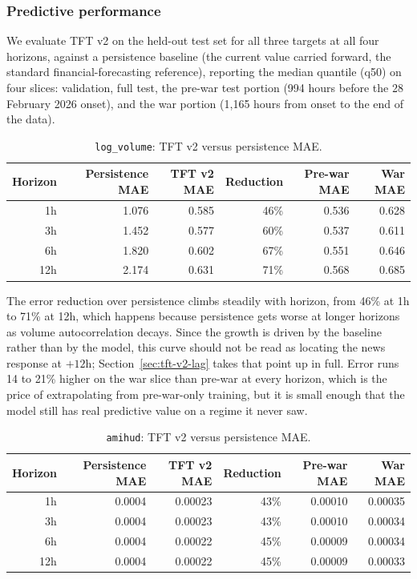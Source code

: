 \subsubsection{Predictive performance}\label{sec:predictive-performance}

We evaluate TFT v2 on the held-out test set for all three targets at all four horizons, against a persistence baseline (the current value carried forward, the standard financial-forecasting reference), reporting the median quantile (q50) on four slices: validation, full test, the pre-war test portion (994 hours before the 28 February 2026 onset), and the war portion (1{,}165 hours from onset to the end of the data).

\begin{table}[h]
  \centering
  \caption{\texttt{log\_volume}: TFT v2 versus persistence MAE.}
  \label{tab:mae-logvolume}
  \begin{tabular}{@{}rrrrrr@{}}
    \toprule
    Horizon & Persistence MAE & TFT v2 MAE & Reduction & Pre-war MAE & War MAE \\
    \midrule
    1h & 1.076 & 0.585 & 46\% & 0.536 & 0.628 \\
    3h & 1.452 & 0.577 & 60\% & 0.537 & 0.611 \\
    6h & 1.820 & 0.602 & 67\% & 0.551 & 0.646 \\
    12h & 2.174 & 0.631 & 71\% & 0.568 & 0.685 \\
    \bottomrule
  \end{tabular}
\end{table}

The error reduction over persistence climbs steadily with horizon, from 46\% at 1h to 71\% at 12h, which happens because persistence gets worse at longer horizons as volume autocorrelation decays. Since the growth is driven by the baseline rather than by the model, this curve should not be read as locating the news response at $+12$h; Section~\ref{sec:tft-v2-lag} takes that point up in full. Error runs 14 to 21\% higher on the war slice than pre-war at every horizon, which is the price of extrapolating from pre-war-only training, but it is small enough that the model still has real predictive value on a regime it never saw.

\begin{table}[h]
  \centering
  \caption{\texttt{amihud}: TFT v2 versus persistence MAE.}
  \label{tab:mae-amihud}
  \begin{tabular}{@{}rrrrrr@{}}
    \toprule
    Horizon & Persistence MAE & TFT v2 MAE & Reduction & Pre-war MAE & War MAE \\
    \midrule
    1h & 0.0004 & 0.00023 & 43\% & 0.00010 & 0.00035 \\
    3h & 0.0004 & 0.00023 & 43\% & 0.00010 & 0.00034 \\
    6h & 0.0004 & 0.00022 & 45\% & 0.00009 & 0.00034 \\
    12h & 0.0004 & 0.00022 & 45\% & 0.00009 & 0.00033 \\
    \bottomrule
  \end{tabular}
\end{table}

